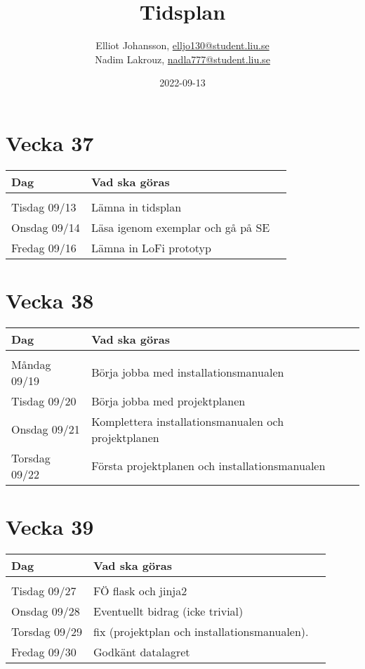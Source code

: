 \documentclass{TDP003mall}
\author{Elliot Johansson, \url{elljo130@student.liu.se}\\
  Nadim Lakrouz, \url{nadla777@student.liu.se}}
\title{Tidsplan}
\date{2022-09-13}
\begin{document}
\projectpage
\section{Vecka 37}
\begin{table}[!h]
\begin{tabularx}{\linewidth}{|l|X|l|}
\hline
Dag & Vad ska göras \\\hline
& \\\hline
Tisdag 09/13 & Lämna in tidsplan\\\hline
Onsdag 09/14 & Läsa igenom exemplar och gå på SE\\\hline
Fredag 09/16 & Lämna in LoFi prototyp\\\hline
\end{tabularx}
\end{table}

\section{Vecka 38}
\begin{table}[!h]
\begin{tabularx}{\linewidth}{|l|X|l|}
\hline
Dag & Vad ska göras \\\hline
& \\\hline
Måndag 09/19 & Börja jobba med installationsmanualen\\\hline
Tisdag 09/20 & Börja jobba med projektplanen\\\hline
Onsdag 09/21 & Komplettera installationsmanualen och projektplanen\\\hline
Torsdag 09/22 & Första projektplanen och installationsmanualen\\\hline
\end{tabularx}
\end{table}

\section{Vecka 39}
\begin{table}[!h]
\begin{tabularx}{\linewidth}{|l|X|l|}
\hline
Dag & Vad ska göras \\\hline
& \\\hline
Tisdag 09/27 & FÖ flask och jinja2\\\hline
Onsdag 09/28 & Eventuellt bidrag (icke trivial)\\\hline
Torsdag 09/29 & fix (projektplan och installationsmanualen).\\\hline
Fredag 09/30 & Godkänt datalagret\\\hline
\end{tabularx}
\end{table}
\end{document}
